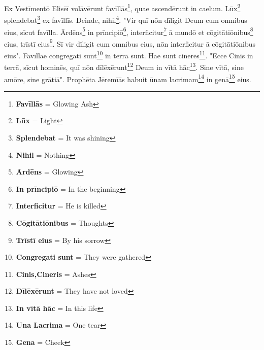 Ex Vestīmentō Elisēī volāvērunt favīllās\footnote{\textbf{Favīllās} = Glowing Ash}, quae ascendērunt in caelum. Lūx\footnote{\textbf{Lūx} = Light} splendebat\footnote{\textbf{Splendebat} = It was shining} ex favīllīs. Deinde, nihil\footnote{\textbf{Nihil} = Nothing}. "Vir quī nōn dīligit Deum cum omnibus eius, sīcut favīlla. Ārdēns\footnote{\textbf{Ārdēns} = Glowing} in prīncipiō\footnote{\textbf{In prīncipiō} = In the beginning}, interficitur\footnote{\textbf{Interficitur} = He is killed} ā mundō et cōgitātiōnibus\footnote{\textbf{Cōgitātiōnibus} = Thoughts} eius, trīstī eius\footnote{\textbf{Trīstī eius} = By his sorrow}. Sī vir dīligit cum omnibus eius, nōn interficitur ā cōgitātiōnibus eius". Favīllae congregati sunt\footnote{\textbf{Congregati sunt} = They were gathered} in terrā sunt. Hae sunt cinerēs\footnote{\textbf{Cinis,Cineris} = Ashes}. "Ecce Cinis in terrā, sīcut hominēs, quī nōn dīlēxērunt\footnote{\textbf{Dīlēxērunt} = They have not loved} Deum in vītā hāc\footnote{\textbf{In vītā hāc} = In this life}. Sine vītā, sine amōre, sine grātiā". Prophēta Jēremīās habuit ūnam lacrimam\footnote{\textbf{Una Lacrima} = One tear} in genā\footnote{\textbf{Gena} = Cheek} eius. \par 
